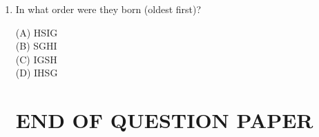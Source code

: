 \documentclass[journal,12pt,onecolumn]{exam}
\theoremstyle{remark}
\begin{document}
\begin{enumerate}
\noindent \item  In what order were they born (oldest first)?

\hfill{}

\begin{multicols}{2}
\noindent(A) HSIG\\
(B) SGHI\\
(C) IGSH\\
(D) IHSG
\end{multicols}

\begin{center}
\section*{END OF QUESTION PAPER}
\end{center}

\end{enumerate}
\end{document}
